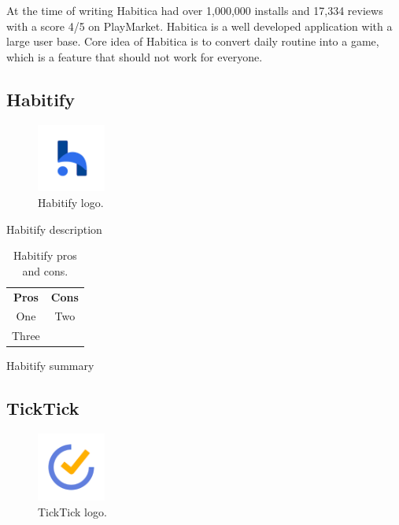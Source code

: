 At the time of writing Habitica had over 1,000,000 installs and 17,334 reviews with a score 4/5 on PlayMarket.
Habitica is a well developed application with a large user base.
Core idea of Habitica is to convert daily routine into a game, which is a feature that should not work for everyone.


\subsection{Habitify}\label{subsec:habitify}

\begin{figure}[h!]
    \includegraphics[width=0.20\textwidth]{images/habitify-logo.png}
    \caption{Habitify logo.\cite{habitify-logo}}
    \label{fig:habitify-logo}
\end{figure}

Habitify description

\begin{table}[h!]
    \centering
    \begin{ctucolortab}
        \begin{tabular}{cc}
            \bfseries Pros & \bfseries Cons\\\Midrule
            One & Two\\
            Three & \\
        \end{tabular}
    \end{ctucolortab}
    \caption{Habitify pros and cons.}\label{tab:habitify-pros-cons}
\end{table}

Habitify summary


\subsection{TickTick}\label{subsec:ticktick}

\begin{figure}[h!]
    \includegraphics[width=0.20\textwidth]{images/ticktick-logo.png}
    \caption{TickTick logo.\cite{ticktick-logo}}
    \label{fig:ticktick-logo}
\end{figure}

